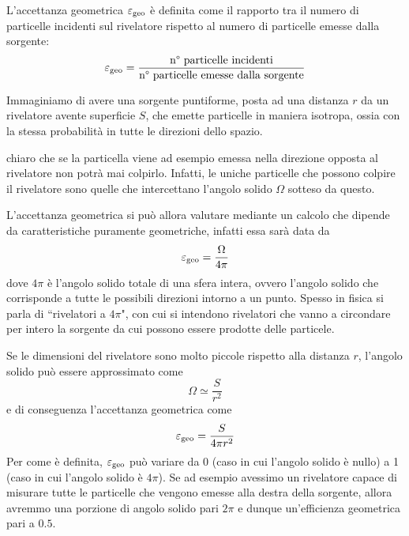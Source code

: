 L'accettanza geometrica $\varepsilon_{\rm geo}$ è definita come il rapporto tra il numero di particelle incidenti sul rivelatore rispetto al numero di particelle emesse dalla sorgente:
\begin{equation*}
   \varepsilon_{\rm geo}
   =\frac{\text{n° particelle incidenti}}{\text{n° particelle emesse dalla sorgente}}
\end{equation*}
\begin{esempio}
   Immaginiamo di avere una sorgente puntiforme, posta ad una distanza $r$ da un rivelatore avente superficie $S$, che emette particelle in maniera isotropa, ossia con la stessa probabilità in tutte le direzioni dello spazio.
   \begin{figure}[H]
      \centering
   \end{figure}
   \E chiaro che se la particella viene ad esempio emessa nella direzione opposta al rivelatore non potrà mai colpirlo. Infatti, le uniche particelle che possono colpire il rivelatore sono quelle che intercettano l'angolo solido $\Omega$ sotteso da questo.
    
   L'accettanza geometrica si può allora valutare mediante un calcolo che dipende da caratteristiche puramente geometriche, infatti essa sarà data da
   \begin{equation*}
      \varepsilon_{\rm geo}=\frac{\Omega}{4\pi}
   \end{equation*}
   dove $4\pi$ è l'angolo solido totale di una sfera intera, ovvero l'angolo solido che corrisponde a tutte le possibili direzioni intorno a un punto. Spesso in fisica si parla di ``rivelatori a $4\pi$", con cui si intendono rivelatori che vanno a circondare per intero la sorgente da cui possono essere prodotte delle particele.

   Se le dimensioni del rivelatore sono molto piccole rispetto alla distanza $r$, l'angolo solido può essere approssimato come
   \begin{equation*}
      \Omega \simeq \frac{S}{r^2}
   \end{equation*}
   e di conseguenza l'accettanza geometrica come
   \begin{equation*}
      \varepsilon_{\rm geo}=\frac{S}{4\pi r^2}
   \end{equation*}
   Per come è definita, $\varepsilon_{\rm geo}$ può variare da 0 (caso in cui l'angolo solido è nullo) a 1 (caso in cui l'angolo solido è $4\pi$). Se ad esempio avessimo un rivelatore capace di misurare tutte le particelle che vengono emesse alla destra della sorgente, allora avremmo una porzione di angolo solido pari $2 \pi$ e dunque un'efficienza geometrica pari a $0.5$.
\end{esempio}

